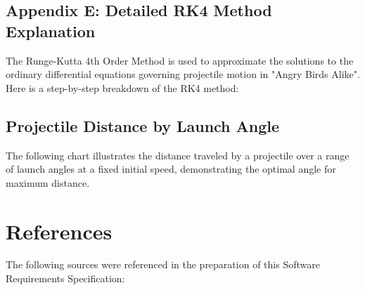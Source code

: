 \documentclass[12pt]{article}
\begin{document}
\subsection{Appendix E: Detailed RK4 Method Explanation}
The Runge-Kutta 4th Order Method is used to approximate the solutions to the ordinary differential equations governing projectile motion in "Angry Birds Alike". Here is a step-by-step breakdown of the RK4 method:

\subsection{Projectile Distance by Launch Angle}
The following chart illustrates the distance traveled by a projectile over a range of launch angles at a fixed initial speed, demonstrating the optimal angle for maximum distance.



\section{References}
The following sources were referenced in the preparation of this Software Requirements Specification:
\end{document}
